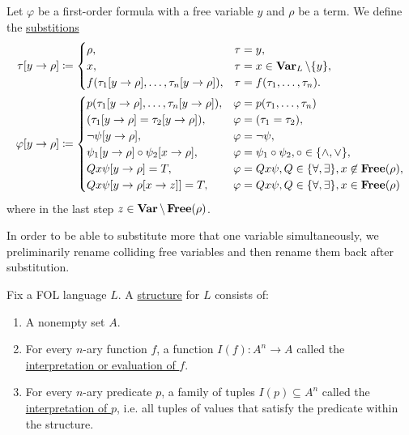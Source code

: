 \begin{definition}\label{def:first_order_substition}
  Let $\varphi$ be a first-order formula with a free variable $y$ and $\rho$ be a term. We define the \uline{substitions}
  \begin{align*}
    \tau[y \to \rho] &\coloneqq \begin{cases}
      \rho,                                              &\tau = y, \\
      x,                                                 &\tau = x \in \operatorname{\mathbf{Var}}_L \setminus \{ y \}, \\
      f(\tau_1[y \to \rho], \ldots, \tau_n[y \to \rho]), &\tau = f(\tau_1, \ldots, \tau_n).
    \end{cases}
    \\
    \varphi[y \to \rho] &\coloneqq \begin{cases}
      p(\tau_1[y \to \rho], \ldots, \tau_n[y \to \rho]), &\varphi = p(\tau_1, \ldots, \tau_n) \\
      (\tau_1[y \to \rho] = \tau_2[y \to \rho]),         &\varphi = (\tau_1 = \tau_2), \\
      \neg \psi[y \to \rho],                             &\varphi = \neg \psi, \\
      \psi_1[y \to \rho] \circ \psi_2[x \to \rho],       &\varphi = \psi_1 \circ \psi_2, \circ \in \{ \land, \lor \}, \\
      Q x \psi[y \to \rho] = T,                          &\varphi = Q x \psi, Q \in \{ \forall, \exists \}, x \not\in \operatorname{\mathbf{Free}}(\rho), \\
      Q x \psi[y \to \rho[x \to z]] = T,                 &\varphi = Q x \psi, Q \in \{ \forall, \exists \}, x \in \operatorname{\mathbf{Free}}(\rho)
    \end{cases}
  \end{align*}
  where in the last step $z \in \operatorname{\mathbf{Var}} \setminus \operatorname{\mathbf{Free}}(\rho)$.

  In order to be able to substitute more that one variable simultaneously, we preliminarily rename colliding free variables and then rename them back after substitution.
\end{definition}

\begin{definition}\label{def:first_order_structure}\cite[definition 4.1]{Nerode2012}
  Fix a FOL language $L$. A \uline{structure} for $L$ consists of:
  \begin{enumerate}
    \item A nonempty set $A$.
    \item For every $n$-ary function $f$, a function $I(f): A^n \to A$ called the \uline{interpretation or evaluation of $f$}.
    \item For every $n$-ary predicate $p$, a family of tuples $I(p) \subseteq A^n$ called the \uline{interpretation of $p$}, i.e. all tuples of values that satisfy the predicate within the structure.
  \end{enumerate}
\end{definition}


